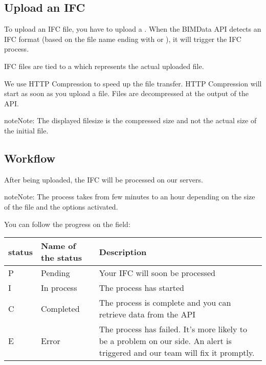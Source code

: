 \documentclass[a4paper,12pt,english]{sphinxmanual}
\begin{document}
\subsection{Upload an IFC}
\label{\detokenize{concepts/ifc:upload-an-ifc}}
To upload an IFC file, you have to upload a .
When the BIMData API detects an IFC format (based on the file name ending with  or ), it will trigger the IFC process.

IFC files are tied to a  which represents the actual uploaded file.

We use HTTP Compression to speed up the file transfer. HTTP Compression will start as soon as you upload a file.
Files are decompressed at the output of the API.

\begin{sphinxadmonition}{note}{Note:}
The displayed filesize is the compressed size and not the actual size of the initial file.
\end{sphinxadmonition}


\subsection{Workflow}
\label{\detokenize{concepts/ifc:workflow}}
After being uploaded, the IFC will be processed on our servers.

\begin{sphinxadmonition}{note}{Note:}
The process takes from few minutes to an hour depending on the size of the file and the options activated.
\end{sphinxadmonition}

You can follow the progress on the  field:


\begin{savenotes}\sphinxattablestart
\centering
\begin{tabulary}{\linewidth}[t]{|T|T|T|}
\hline
\sphinxstyletheadfamily 
status
&\sphinxstyletheadfamily 
Name of the status
&\sphinxstyletheadfamily 
Description
\\
\hline
P
&
Pending
&
Your IFC will soon be processed
\\
\hline
I
&
In process
&
The process has started
\\
\hline
C
&
Completed
&
The process is complete and you can retrieve data from the API
\\
\hline
E
&
Error
&
The process has failed.
It’s more likely to be a problem on our side.
An alert is triggered and our team will fix it promptly.
\\
\hline
\end{tabulary}
\par
\sphinxattableend\end{savenotes}
\end{document}

